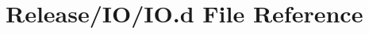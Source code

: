 \hypertarget{_release_2_i_o_2_i_o_8d}{\section{Release/\-I\-O/\-I\-O.d File Reference}
\label{dd/d49/_release_2_i_o_2_i_o_8d}
}
